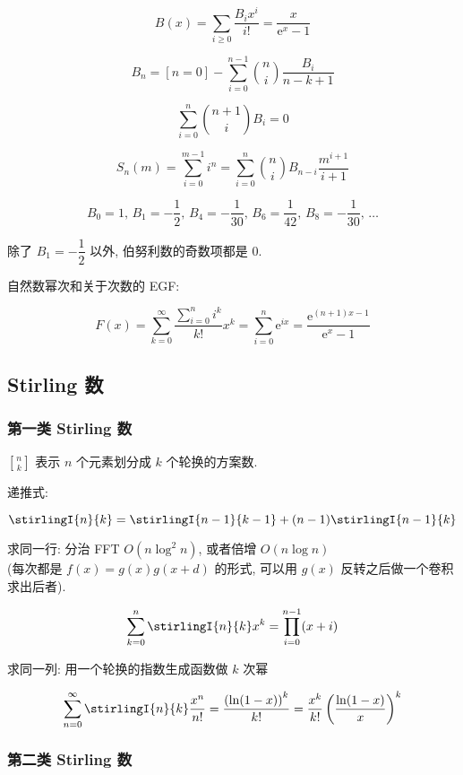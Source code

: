 \[
    B(x)=\sum_{i\ge 0}\frac{B_i x^i}{i!}=\frac x{\mathrm{e}^x-1}
\]

\[
    B_n=[n=0]-\sum_{i=0}^{n-1}\binom{n}{i}\frac{B_i}{n-k+1}
\]

\[
    \sum_{i=0}^n\binom{n+1}{i}B_i=0
\]

\[
    S_n(m)=\sum_{i=0}^{m-1}i^n=\sum_{i=0}^n\binom{n}{i}B_{n-i}\frac{m^{i+1}}{i+1}
\]

\[
    B_0 = 1, \, B_1 = -\frac{1}{2}, \, B_4 = -\frac{1}{30}, \, B_6 = \frac{1}{42}, \, B_8 = -\frac{1}{30}, \, \dots
\]

除了 \(B_1 = -\dfrac{1}{2}\) 以外, 伯努利数的奇数项都是 \(0\).

自然数幂次和关于次数的 EGF:

\[
    F(x)=\sum_{k=0}^\infty \frac{\sum_{i=0}^n i^k}{k!}x^k=\sum_{i=0}^n \mathrm{e}^{ix}=\frac{\mathrm{e}^{(n+1)x-1}}{\mathrm{e}^x-1}
\]

\subsection{Stirling 数}
\label{sec:stirling-数}

\subsubsection{第一类 Stirling 数}
\label{ssec:第一类-stirling-数}

\(n\brack k\) 表示 \(n\) 个元素划分成 \(k\) 个轮换的方案数.

递推式:

\[
    \stirlingI{n}{k} = \stirlingI{n-1}{k-1} + (n-1)\stirlingI{n-1}{k}
\]

求同一行: 分治 FFT \(O(n\log ^2 n)\), 或者倍增 \(O(n\log n)\) \\(每次都是 \(f(x) = g(x) g(x + d)\) 的形式, 可以用 \(g(x)\) 反转之后做一个卷积求出后者).

\[
    \sum_{k = 0}^n \stirlingI{n}{k} x^k = \prod_{i = 0}^{n - 1} (x + i)
\]

求同一列: 用一个轮换的指数生成函数做 \(k\) 次幂

\[
    \sum_{n = 0}^\infty \stirlingI{n}{k} \frac{x^n}{n!} = \frac{\left(\ln (1 - x)\right)^k}{k!} = \frac{x^k}{k!} \left( \frac{\ln (1 - x)}{x} \right)^k
\]

\subsubsection{第二类 Stirling 数}
\label{ssec:第二类-stirling-数}

